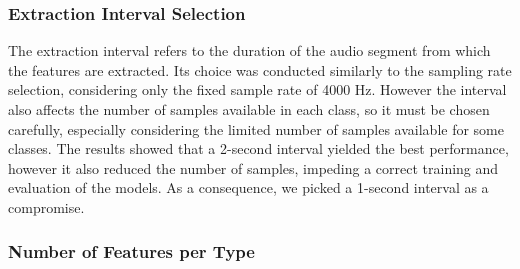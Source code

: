 \subsubsection{Extraction Interval Selection}  %
\label{sec:extraction_interval}
The extraction interval refers to the duration of the audio segment from which the features are extracted.
Its choice was conducted similarly to the sampling rate selection, considering only the fixed sample rate of 4000 Hz.
However the interval also affects the number of samples available in each class, so it must be chosen carefully, 
especially considering the limited number of samples available for some classes.
The results showed that a 2-second interval yielded the best performance, however it also reduced the number of samples,
impeding a correct training and evaluation of the models. As a consequence, we picked a 1-second interval as a compromise.

\subsubsection{Number of Features per Type} %